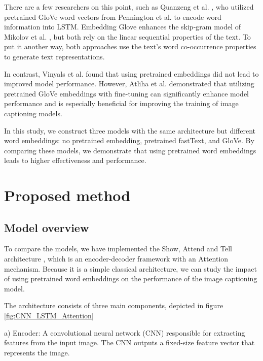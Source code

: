 \documentclass[conference]{IEEEtran}
\begin{document}
There are a few researchers on this point, such as Quanzeng et al. \cite{you2016image}, who utilized pretrained GloVe word vectors from Pennington et al. \cite{pennington2014glove} to encode word information into LSTM. Embedding Glove enhances the skip-gram model of Mikolov et al. \cite{mikolov2013efficient}, but both rely on the linear sequential properties of the text. To put it another way, both approaches use the text’s word co-occurrence properties to generate text representations.


In contrast, Vinyals et al. \cite{vinyals2016show} found that using pretrained embeddings did not lead to improved model performance. However, Atliha et al. \cite{atliha2021pretrained} demonstrated that utilizing pretrained GloVe embeddings with fine-tuning can significantly enhance model performance and is especially beneficial for improving the training of image captioning models.

In this study, we construct three models with the same architecture but different word embeddings: no pretrained embedding, pretrained fastText, and GloVe. By comparing these models, we demonstrate that using pretrained word embeddings leads to higher effectiveness and performance.



\section{Proposed method}

\subsection{Model overview}
To compare the models, we have implemented the Show, Attend and Tell architecture \cite{xu2015show},
which is an encoder-decoder framework with an Attention mechanism. Because it is a simple classical architecture, we can study the impact of using pretrained word embeddings on the performance of the image captioning model.


The architecture consists of three main components, depicted in figure \ref{fig:CNN_LSTM_Attention}

a) Encoder: A convolutional neural network (CNN) responsible for extracting features from the input image. The CNN outputs a fixed-size feature vector that represents the image.
\end{document}
